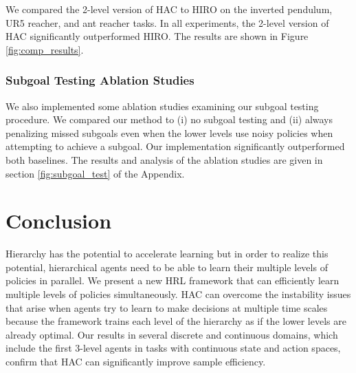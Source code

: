 \documentclass{article} %
\begin{document}
We compared the 2-level version of HAC to HIRO on the inverted pendulum, UR5 reacher, and ant reacher tasks.  In all experiments, the 2-level version of HAC significantly outperformed HIRO.  The results are shown in Figure \ref{fig:comp_results}.  

\subsubsection{Subgoal Testing Ablation Studies}

We also implemented some ablation studies examining our subgoal testing procedure.  We compared our method to (i) no subgoal testing and (ii) always penalizing missed subgoals even when the lower levels use noisy policies when attempting to achieve a subgoal.  Our implementation significantly outperformed both baselines.  The results and analysis of the ablation studies are given in section \ref{fig:subgoal_test} of the Appendix.  







\vspace{-.2cm}
\section{Conclusion}

Hierarchy has the potential to accelerate learning but in order to realize this potential, hierarchical agents need to be able to learn their multiple levels of policies in parallel. We present a new HRL framework that can efficiently learn multiple levels of policies simultaneously. HAC can overcome the instability issues that arise when agents try to learn to make decisions at multiple time scales because the framework trains each level of the hierarchy as if the lower levels are already optimal. Our results in several discrete and continuous domains, which include the first 3-level agents in tasks with continuous state and action spaces, confirm that HAC can significantly improve sample efficiency.
\end{document}
